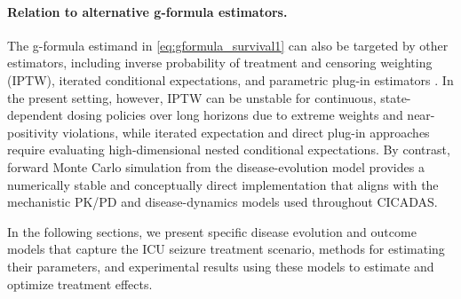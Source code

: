 \paragraph{Relation to alternative g-formula estimators.}
The g-formula estimand in \eqref{eq:gformula_survival1} can also be targeted by other
estimators, including inverse probability of treatment and censoring weighting (IPTW),
iterated conditional expectations, and parametric plug-in estimators
\cite{hernan2020causal}. In the present setting, however, IPTW can be unstable for
continuous, state-dependent dosing policies over long horizons due to extreme weights
and near-positivity violations, while iterated expectation and direct plug-in approaches
require evaluating high-dimensional nested conditional expectations. By contrast,
forward Monte Carlo simulation from the disease-evolution model provides a numerically
stable and conceptually direct implementation that aligns with the mechanistic PK/PD and
disease-dynamics models used throughout CICADAS.

In the following sections, we present specific disease evolution and outcome models
that capture the ICU seizure treatment scenario, methods for estimating their
parameters, and experimental results using these models to estimate and optimize
treatment effects.

